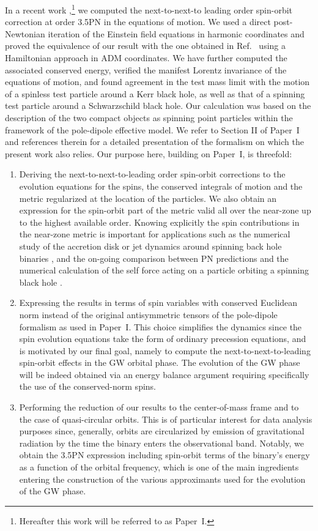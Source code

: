 \documentclass[
superscriptaddress,
preprint,
prd,tightenlines,showpacs,nofootinbib,
eqsecnum,
amsfonts,amsmath,amssymb]{revtex4-1}
\begin{document}
In a recent work \cite{Marsat2012},\footnote{Hereafter this work will
  be referred to as Paper~I.} we computed the next-to-next-to leading
order spin-orbit correction at order 3.5PN in the equations of
motion. We used a direct post-Newtonian iteration of the Einstein
field equations in harmonic coordinates and proved the equivalence of
our result with the one obtained in Ref.~\cite{Hartung2011} using a
Hamiltonian approach in ADM coordinates. We have further computed the
associated conserved energy, verified the manifest Lorentz invariance
of the equations of motion, and found agreement in the test mass limit
with the motion of a spinless test particle around a Kerr black hole,
as well as that of a spinning test particle around a Schwarzschild
black hole. Our calculation was based on the description of the two
compact objects as spinning point particles within the framework of
the pole-dipole effective model. We refer to Section II of Paper~I and
references therein for a detailed presentation of the formalism on
which the present work also relies. Our purpose here, building on
Paper~I, is threefold:
%
\begin{enumerate}
\item Deriving the next-to-next-to-leading order spin-orbit
  corrections to the evolution equations for the spins, the conserved
  integrals of motion and the metric regularized at the location of
  the particles. We also obtain an expression for the spin-orbit part
  of the metric valid all over the near-zone up to the highest
  available order. Knowing explicitly the spin contributions in the
  near-zone metric is important for applications such as the numerical
  study of the accretion disk or jet dynamics around spinning back
  hole binaries \cite{GNYC12}, and the on-going comparison
  between PN predictions and the numerical calculation of the self
  force acting on a particle orbiting a spinning black hole
  \cite{BBL12,FLS12}.
%
\item Expressing the results in terms of spin variables with conserved
  Euclidean norm instead of the original antisymmetric tensors of the
  pole-dipole formalism as used in Paper~I. This choice simplifies the
  dynamics since the spin evolution equations take the form of
  ordinary precession equations, and is motivated by our final goal,
  namely to compute the next-to-next-to-leading spin-orbit effects in
  the GW orbital phase. The evolution of the GW phase will be indeed
  obtained via an energy balance argument requiring specifically the
  use of the conserved-norm spins.
%
\item Performing the reduction of our results to the center-of-mass
  frame and to the case of quasi-circular orbits. This is of
  particular interest for data analysis purposes since, generally,
  orbits are circularized by emission of gravitational
  radiation by the time the binary enters the observational
  band. Notably, we obtain the 3.5PN expression including spin-orbit
  terms of the binary's energy as a function of the orbital frequency,
  which is one of the main ingredients entering the construction of
  the various approximants used for the evolution of the GW phase.
\end{enumerate}
\end{document}

